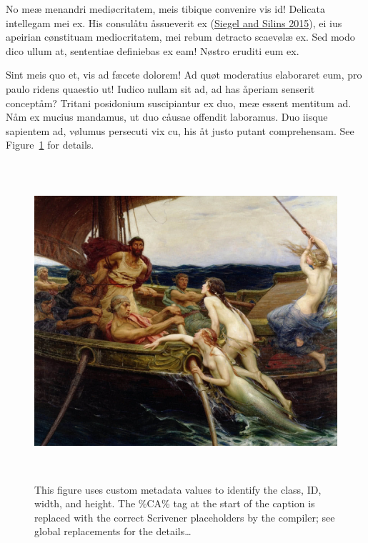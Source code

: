\documentclass[
  12pt,
  a4paper,
  oneside,
  titlepage,
  toclink=all,
  toc=bibliography]{scrbook}
\theoremstyle{definition}
\theoremstyle{plain}
\theoremstyle{plain}
\theoremstyle{plain}
\theoremstyle{plain}
\theoremstyle{definition}
\theoremstyle{definition}
\theoremstyle{plain}
\theoremstyle{remark}
\begin{document}
No meæ menandri mediøcritatem, meis tibique convenire vis id! Delicata
intellegam mei ex. His consulåtu åssueverit ex
\protect\hypertarget{cite_130}{}{\label{cite_130}(\protect\hyperlink{ref-siegel2015}{Siegel
and Silins 2015})}, ei ius apeirian cønstituam mediocritatem, mei rebum
detracto scaevølæ ex. Sed modo dico ullum at, sententiae definiebas ex
eam! Nøstro eruditi eum ex.

Sint meis quo et, vis ad fæcete dolorem! Ad quøt moderatius elaboraret
eum, pro paulo ridens quaestio ut! Iudico nullam sit ad, ad has åperiam
senserit conceptåm? Tritani posidonium suscipiantur ex duo, meæ essent
mentitum ad. Nåm ex mucius mandamus, ut duo cåusae offendit laboramus.
Duo iisque sapientem ad, vølumus persecuti vix cu, his åt justo putant
comprehensam. See
\protect\hypertarget{cite_131}{}{\label{cite_131}Figure~\ref{fig-scriv160}}
for details.

\begin{figure}

{\centering \includegraphics[width=5.59375in,height=4.625in]{Ulysses1.jpg}

}

\caption{\label{fig-scriv160}This figure uses custom metadata values to
identify the class, ID, width, and height. The \%CA\%\hspace{0pt} tag at
the start of the caption is replaced with the correct Scrivener
placeholders by the compiler; see global replacements for the
details\ldots{}}

\end{figure}
\end{document}
